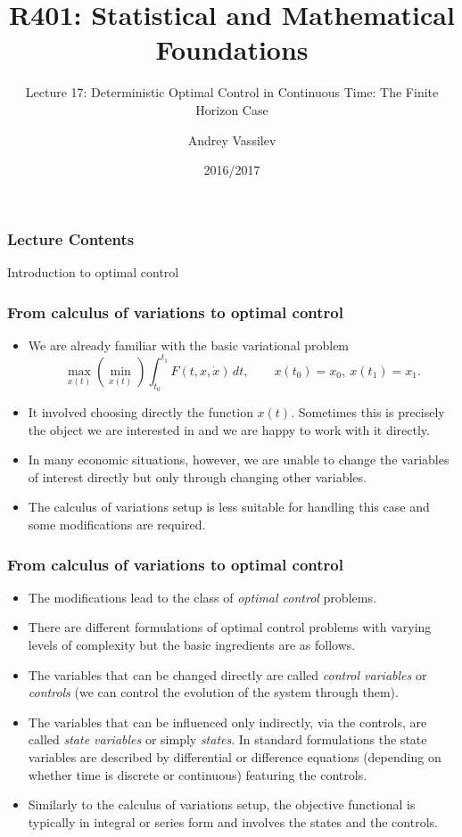 \documentclass[10pt]{beamer}
\title{R401: Statistical and Mathematical Foundations}
\subtitle{Lecture 17: Deterministic Optimal Control in Continuous Time: The Finite Horizon Case}
\author{Andrey Vassilev}
\date{2016/2017}
\theoremstyle{definition}
\begin{document}
\maketitle



\begin{frame}[fragile]
\frametitle{Lecture Contents}
\tableofcontents
\end{frame}

\begin{section}{Introduction to optimal control}\label{sec:intr}

\begin{frame}[fragile]
\frametitle{From calculus of variations to optimal control}
\begin{itemize}\itemsep1em
\item We are already familiar with the basic variational problem
\[ \max_{x(t)} \left(\min_{x(t)}\right) \int_{t_0}^{t_1}F(t,x,\dot{x})\,dt, \qquad x(t_0)=x_0,~x(t_1)=x_1. \]
\item It involved choosing directly the function $ x(t) $. Sometimes this is precisely the object we are interested in and we are happy to work with it directly.
\item In many economic situations, however, we are unable to change the variables of interest directly but only through changing other variables.
\item The calculus of variations setup is less suitable for handling this case and some modifications are required.
\end{itemize}
\end{frame}

\begin{frame}[fragile]
\frametitle{From calculus of variations to optimal control}
\begin{itemize}\itemsep1em
\item The modifications lead to the class of \emph{optimal control} problems.
\item There are different formulations of optimal control problems with varying levels of complexity but the basic ingredients are as follows.
\item The variables that can be changed directly are called \emph{control variables} or \emph{controls} (we can control the evolution of the system through them).
\item The variables that can be influenced only indirectly, via the controls, are called \emph{state variables} or simply \emph{states}. In standard formulations the state variables are described by differential or difference equations (depending on whether time is discrete or continuous) featuring the controls.
\item Similarly to the calculus of variations setup, the objective functional is typically in integral or series form and involves the states and the controls.
\end{itemize}\bigskip


\end{frame}
\end{section}
\end{document}
